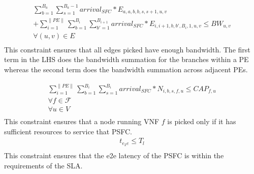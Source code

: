 \documentclass[journal]{IEEEtran}
\begin{document}
\begin{equation}
\begin{split}
     \sum_{b=1}^{B_a} \sum_{s=1}^{B_a - 1} arrival_{SFC} * E_{a,a,b,b,s,s+1,u,v}\\ + \sum_{i=1}^{\lVert PE \rVert} \sum_{b=1}^{B_i} \sum_{b'=1}^{B_{i+1}} arrival_{SFC} * E_{i,i+1,b,b',B_i,1,u,v} \leq BW_{u,v} \\
    \forall (u,v) \in  E\\
\end{split}
\end{equation}
This constraint ensures that all edges picked have enough bandwidth. The first term in the LHS does the bandwidth summation for the branches within a PE whereas the second term does the bandwidth summation across adjacent PEs.

\begin{equation}
\begin{split}
    \sum_{i=1}^{\lVert PE \rVert} \sum_{b=1}^{B_i} \sum_{s=1}^{B_i} arrival_{SFC} * N_{i,b,s,f,u} \leq CAP_{f,u} \\
    \forall f \in \mathcal{F}\\
    \forall u \in V\\
\end{split}
\end{equation}
This constraint ensures that a node running VNF $f$ is picked only if it has sufficient resources to service that PSFC.\\

\begin{equation}
\begin{split}
 t_{e_2e}\leq T_l\\ 
\end{split}
\end{equation}
This constraint ensures that the e2e latency of the PSFC is within the requirements of the SLA.
\end{document}
